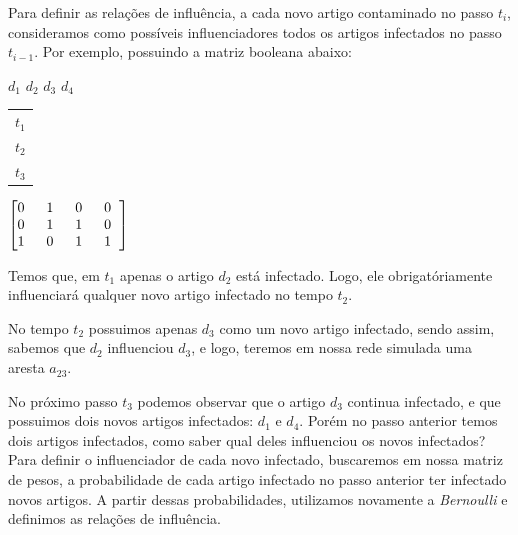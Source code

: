 \documentclass[a4paper,12pt]{article}
\begin{document}
  Para definir as relações de influência, a cada novo artigo contaminado no passo $t_{i}$, consideramos como possíveis influenciadores todos os artigos
  infectados no passo $t_{i-1}$. Por exemplo, possuindo a matriz booleana abaixo:
  
    \begin{center}
    \hspace{0.67cm}$d_{1}$ \hspace{0.3cm}$d_{2}$ \hspace{0.3cm}$d_{3}$ \hspace{0.3cm}$d_{4}$

    \vspace{0.2cm}

    \begin{tabular}{c}
      $t_{1}$ \\
      $t_{2}$ \\
      $t_{3}$
    \end{tabular}
    $
    \begin{bmatrix}
      0\hspace{0.2cm} & 1\hspace{0.2cm} & 0\hspace{0.2cm}& 0\hspace{0.2cm}\\
      0\hspace{0.2cm} & 1\hspace{0.2cm} & 1\hspace{0.2cm} & 0\hspace{0.2cm}\\
      1\hspace{0.2cm} & 0\hspace{0.2cm} & 1\hspace{0.2cm} & 1\hspace{0.2cm}
    \end{bmatrix}
    $

    \end{center}
    
    Temos que, em $t_{1}$ apenas o artigo $d_{2}$ está infectado. Logo, ele obrigatóriamente influenciará qualquer novo artigo infectado
    no tempo $t_{2}$. 
    
    No tempo $t_{2}$ possuimos apenas $d_{3}$ como um novo artigo infectado, sendo assim, sabemos que $d_{2}$ influenciou $d_{3}$, e logo,
    teremos em nossa rede simulada uma aresta $a_{23}$.
    
    No próximo passo $t_{3}$ podemos observar que o artigo $d_{3}$ continua infectado, e que possuimos dois novos artigos infectados:
    $d_{1}$ e $d_{4}$. Porém no passo anterior temos dois artigos infectados, como saber qual deles influenciou os novos infectados?
    Para definir o influenciador de cada novo infectado, buscaremos em nossa matriz de pesos, a probabilidade de cada artigo infectado
    no passo anterior ter infectado novos artigos. A partir dessas probabilidades, utilizamos novamente a \textit{Bernoulli} e definimos
    as relações de influência. 
    
\end{document}
